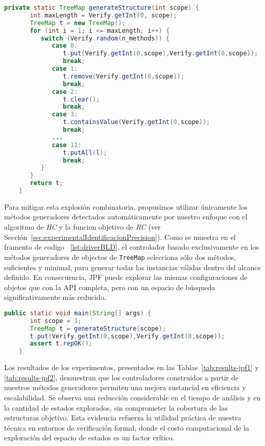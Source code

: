 \begin{lstlisting}[language=Java,caption={Controlador con todos los métodos},label={lst:driverAPI},captionpos=b]
    private static TreeMap generateStructure(int scope) {
       int maxLength = Verify.getInt(0, scope);
       TreeMap t = new TreeMap();
       for (int i = 1; i <= maxLength; i++) {
          switch (Verify.random(n_methods)) {
             case 0:
                t.put(Verify.getInt(0,scope),Verify.getInt(0,scope));
                break;
             case 1:
                t.remove(Verify.getInt(0,scope));
                break;						
             case 2:
                t.clear();
                break;
             case 3:
                t.containsValue(Verify.getInt(0,scope));
                break;
             ...
             case 11: 
                t.putAll(l);
                break;
          }
       }
       return t;
    }
\end{lstlisting}

Para mitigar esta explosión combinatoria, propusimos utilizar únicamente los métodos generadores 
detectados automáticamente por nuestro enfoque con el algoritmo de \emph{HC} y la funcion objetivo de \emph{RC} (ver Sección~\ref{sec:experimentalIdentificacionPrecision}). 
Como se muestra en el framento de codigo ~\ref{lst:driverBLD}, el controlador basado exclusivamente en los métodos generadores de objectos de 
\texttt{TreeMap} selecciona sólo dos métodos, suficientes y minimal, para generar todas las instancias 
válidas dentro del alcance definido. En consecuencia, JPF puede explorar las mismas configuraciones 
de objetos que con la API completa, pero con un espacio de búsqueda significativamente más reducido.

\begin{lstlisting}[caption={Probando el método put de TreeMap con JPF},label={lst:driverBLD},language=Java,captionpos=b]
    public static void main(String[] args) {
       int scope = 3;
       TreeMap t = generateStructure(scope);
       t.put(Verify.getInt(0,scope),Verify.getInt(0,scope));
       assert t.repOK();
    }
\end{lstlisting}

Los resultados de los experimentos, presentados en las Tablas~\ref{tab:results-jpf1} y 
\ref{tab:results-jpf2}, demuestran que los controladores construidos a partir de nuestros 
métodos generadores permiten una mejora sustancial en eficiencia y escalabilidad. Se observa una 
reducción considerable en el tiempo de análisis y en la cantidad de estados explorados, sin 
comprometer la cobertura de las estructuras objetivo. Esta evidencia refuerza la utilidad práctica 
de nuestra técnica en entornos de verificación formal, donde el costo computacional de la exploración 
del espacio de estados es un factor crítico.

